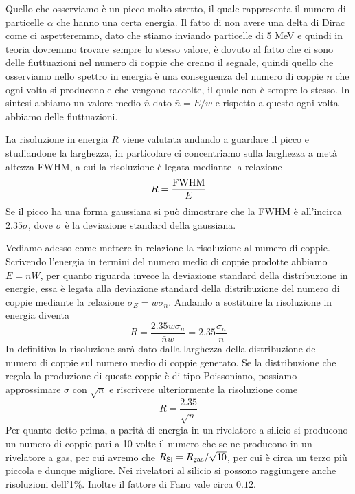 \vspace{-0.4cm}Quello che osserviamo è un picco molto stretto, il quale rappresenta il numero di particelle $\alpha$ che hanno una certa energia. Il fatto di non avere una delta di Dirac come ci aspetteremmo, dato che stiamo inviando particelle di 5 MeV e quindi in teoria dovremmo trovare sempre lo stesso valore, è dovuto al fatto che ci sono delle fluttuazioni nel numero di coppie che creano il segnale, quindi quello che osserviamo nello spettro in energia è una conseguenza del numero di coppie $n$ che ogni volta si producono e che vengono raccolte, il quale non è sempre lo stesso. In sintesi abbiamo un valore medio $\bar{n}$ dato $\bar{n}=E/w$ e rispetto a questo ogni volta abbiamo delle fluttuazioni.

La risoluzione in energia $R$ viene valutata andando a guardare il picco e studiandone la larghezza, in particolare ci concentriamo sulla larghezza a metà altezza FWHM, a cui la risoluzione è legata mediante la relazione
\begin{equation*}
   R=\frac{\rm FWHM}{E}
\end{equation*}
Se il picco ha una forma gaussiana si può dimostrare che la FWHM è all'incirca $2.35 \sigma$, dove $\sigma$ è la deviazione standard della gaussiana.

Vediamo adesso come mettere in relazione la risoluzione al numero di coppie. Scrivendo l'energia in termini del numero medio di coppie prodotte abbiamo $E=\bar{n}W$, per quanto riguarda invece la deviazione standard della distribuzione in energie, essa è legata alla deviazione standard della distribuzione del numero di coppie mediante la relazione $\sigma_E=w \sigma_n$. Andando a sostituire la risoluzione in energia diventa
\begin{equation*}
   R
   =\frac{2.35w \sigma_n}{\bar{n} w}
   =2.35\frac{\sigma_n}{n}
\end{equation*}
In definitiva la risoluzione sarà dato dalla larghezza della distribuzione del numero di coppie sul numero medio di coppie generato. Se la distribuzione che regola la produzione di queste coppie è di tipo Poissoniano, possiamo approssimare $\sigma$ con $\sqrt{n}$ e riscrivere ulteriormente la risoluzione come
\begin{equation*}
   R=\frac{2.35}{\sqrt{n}}
\end{equation*}
Per quanto detto prima, a parità di energia in un rivelatore a silicio si producono un numero di coppie pari a 10 volte il numero che se ne producono in un rivelatore a gas, per cui avremo che $R_{\rm Si}=R_{\rm gas}/\sqrt{10}$, per cui è circa un terzo più piccola e dunque migliore. Nei rivelatori al silicio si possono raggiungere anche risoluzioni dell'1\%. Inoltre il fattore di Fano vale circa $0.12$.

